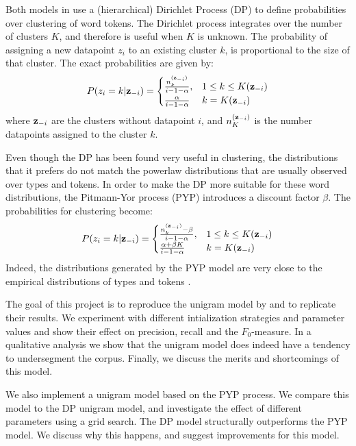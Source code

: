Both models in \cite{Goldwater200921} use a (hierarchical) Dirichlet Process (DP) to define probabilities over clustering of word tokens. The Dirichlet process integrates over the number of clusters $K$, and therefore is useful when $K$ is unknown. The probability of assigning a new datapoint $z_i$ to an existing cluster $k$, is proportional to the size of that cluster. The exact probabilities are given by:
\begin{align}
P(z_i=k|\bm{\mathbf{z}}_{-i}) = 
\begin{cases}
    \frac{n_k^{(\bm{\mathbf{z}}_{-i})}}{i - 1 - \alpha},& 1 \le k \le K(\bm{\mathbf{z}}_{-i})\\
    \frac{\alpha}{i - 1 - \alpha}              & k = K(\bm{\mathbf{z}}_{-i})\\
\end{cases} \label{eq:DP}
\end{align}
where $\bm{\mathbf{z}}_{-i}$ are the clusters without datapoint $i$, and $n_K^{(\bm{\mathbf{z}}_{-i})}$ is the number datapoints assigned to the cluster $k$.

Even though the DP has been found very useful in clustering, the distributions that it prefers do not match the powerlaw distributions that are usually observed over types and tokens. In order to make the DP more suitable for these word distributions, the Pitmann-Yor process (PYP) \cite{pitman1997two} introduces a discount factor $\beta$. The probabilities for clustering become:
\begin{align}
P(z_i=k|\bm{\mathbf{z}}_{-i}) = 
\begin{cases}
    \frac{n_k^{(\bm{\mathbf{z}}_{-i})} - \beta}{i - 1 - \alpha},& 1 \le k \le K(\bm{\mathbf{z}}_{-i})\\
    \frac{\alpha + \beta K}{i - 1 - \alpha}              & k = K(\bm{\mathbf{z}}_{-i})\\
\end{cases}  \label{eq:PYP}
\end{align}
Indeed, the distributions generated by the PYP model are very close to the empirical distributions of types and tokens \cite{goldwater2005interpolating}.


The goal of this project is to reproduce the unigram model by \cite{Goldwater200921} and to replicate their results. We experiment with different intialization strategies and parameter values and show their effect on precision, recall and the $F_0$-measure. In a qualitative analysis we show that the unigram model does indeed have a tendency to undersegment the corpus. Finally, we discuss the merits and shortcomings of this model. 

We also implement a unigram model based on the PYP process. We compare this model to the DP unigram model, and investigate the effect of different parameters using a grid search. The DP model structurally outperforms the PYP model. We discuss why this happens, and suggest improvements for this model.
